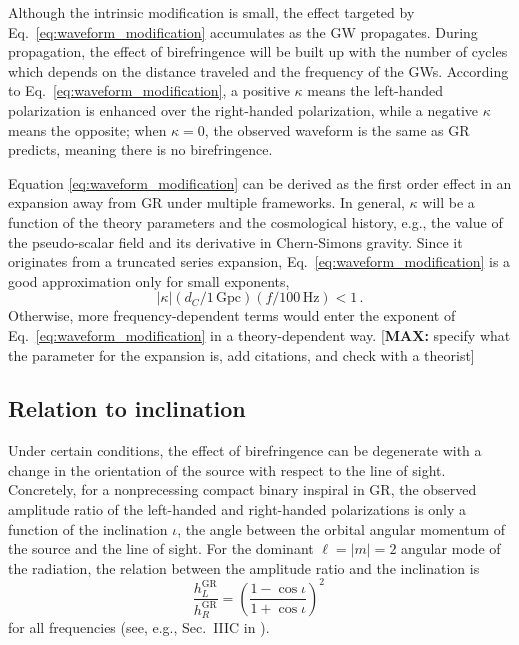 \documentclass[aps,prd,twocolumn,superscriptaddress,preprintnumbers,floatfix,nofootinbib]{revtex4-2}
\newcommand*{\mi}[1]{\textsf{\color{magenta} [\textbf{MAX:} #1]}}
\begin{document}
Although the intrinsic modification is small, the effect targeted by Eq.~\eqref{eq:waveform_modification} accumulates as the \ac{GW} propagates.
During propagation, the effect of birefringence will be built up with the number of cycles which depends on the distance traveled and the frequency of the \acp{GW}.
According to Eq.~\eqref{eq:waveform_modification}, a positive $\kappa$ means the left-handed polarization is enhanced over the right-handed polarization, while a negative $\kappa$ means the opposite;
when $\kappa=0$, the observed waveform is the same as \ac{GR} predicts, meaning there is no birefringence.

Equation \eqref{eq:waveform_modification} can be derived as the first order effect in an expansion away from \ac{GR} under multiple frameworks.
In general, $\kappa$ will be a function of the theory parameters and the cosmological history, e.g., the value of the pseudo-scalar field and its derivative in Chern-Simons gravity.
Since it originates from a truncated series expansion, Eq.~\eqref{eq:waveform_modification} is a good approximation only for small exponents, 
\begin{equation}
\left|\kappa\right| \left(d_C/1\,\mathrm{Gpc}\right) \left(f/100\, \mathrm{Hz}\right) < 1\, .
\end{equation}
Otherwise, more frequency-dependent terms would enter the exponent of Eq.~\eqref{eq:waveform_modification} in a theory-dependent way.
\mi{specify what the parameter for the expansion is, add citations, and check with a theorist}

\subsection{Relation to inclination}

Under certain conditions, the effect of birefringence can be degenerate with a change in the orientation of the source with respect to the line of sight.
Concretely, for a nonprecessing compact binary inspiral in \ac{GR}, the observed amplitude ratio of the left-handed and right-handed polarizations is only a function of the inclination $\iota$, the angle between the orbital angular momentum of the source and the line of sight.
For  the dominant $\ell = |m| = 2$ angular mode of the radiation, the relation between the amplitude ratio and the inclination is
\begin{equation}
    \frac{h_{L}^\mathrm{GR}}{h^\mathrm{GR}_{R}}=\left(\frac{1-\cos\iota}{1+\cos\iota}\right)^2\,
\end{equation}
for all frequencies (see, e.g., Sec.~IIIC in \cite{Isi:2022mbx}).
\end{document}
